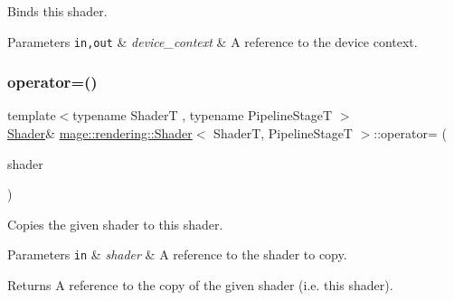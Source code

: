 Binds this shader.


\begin{DoxyParams}[1]{Parameters}
\mbox{\tt in,out}  & {\em device\+\_\+context} & A reference to the device context. \\
\hline
\end{DoxyParams}
\mbox{\label{classmage_1_1rendering_1_1_shader_a66253b5dd8a5ef1cd766512b4ab15e6c}} 
\subsubsection{\texorpdfstring{operator=()}{operator=()}\hspace{0.1cm}{\footnotesize\ttfamily [1/2]}}
{\footnotesize\ttfamily template$<$typename ShaderT , typename Pipeline\+StageT $>$ \\
\mbox{\hyperlink{classmage_1_1rendering_1_1_shader}{Shader}}\& \mbox{\hyperlink{classmage_1_1rendering_1_1_shader}{mage\+::rendering\+::\+Shader}}$<$ ShaderT, Pipeline\+StageT $>$\+::operator= (\begin{DoxyParamCaption}\item[{const \mbox{\hyperlink{classmage_1_1rendering_1_1_shader}{Shader}}$<$ ShaderT, Pipeline\+StageT $>$ \&}]{shader }\end{DoxyParamCaption})\hspace{0.3cm}{\ttfamily [delete]}}

Copies the given shader to this shader.


\begin{DoxyParams}[1]{Parameters}
\mbox{\tt in}  & {\em shader} & A reference to the shader to copy. \\
\hline
\end{DoxyParams}
\begin{DoxyReturn}{Returns}
A reference to the copy of the given shader (i.\+e. this shader). 
\end{DoxyReturn}
\mbox{\label{classmage_1_1rendering_1_1_shader_a940217c505f3994d1f6057345d52cb36}} 
